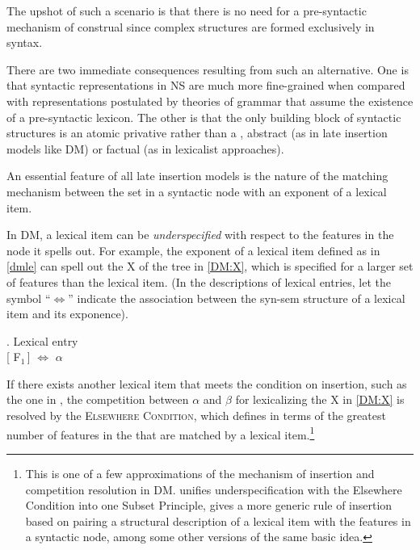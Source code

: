 The upshot of such a scenario is that there is no need for a pre-syntactic mechanism of construal since complex  structures are formed exclusively in syntax. 
\par
There are two immediate consequences resulting from such an alternative. One is that syntactic representations in NS  are much more fine-grained when compared with representations postulated by theories of grammar that assume the existence of a pre-syntactic lexicon.  The other is that the only building block of syntactic structures is an atomic privative  rather than a , abstract (as in late insertion models like DM) or factual (as in lexicalist approaches). 
\par
An essential feature of all late insertion models is the nature of the matching mechanism between the  set in a syntactic node with an exponent of a lexical item. 
\par
In DM,  a lexical item can be \textit{underspecified} with respect to the features in the node it spells out. For example, the exponent of a lexical item defined as in \ref{dmle} can spell out the  X of the tree in \ref{DM:X}, which is specified for a larger set of features than the lexical item. (In the descriptions of lexical entries, let the symbol ``$\Leftrightarrow$'' indicate the association between the syn-sem structure of a lexical item and its exponence).


\ex. Lexical entry\label{dmle}\\[0.5ex]
 [ F$_{1}$\,] $\Leftrightarrow$ $\alpha$  

\noindent
If there exists another lexical item that meets the condition on insertion, such as the one in \Next, the competition between $\alpha$ and $\beta$ for lexicalizing the  X in \ref{DM:X} is resolved by the \textsc{Elsewhere Condition}, which \cite{Halle1997} defines in terms of the greatest number of features in the  that are matched by a lexical item.\footnote{This is one of a few approximations of the mechanism of insertion and competition resolution in  DM. \cite{Halle1997} unifies underspecification with the Elsewhere Condition into one Subset Principle, \cite{Bobaljik2017} gives a more generic rule of insertion based on pairing a structural description of a lexical item with the features in a syntactic node, among some other versions of the same basic idea.
}%

